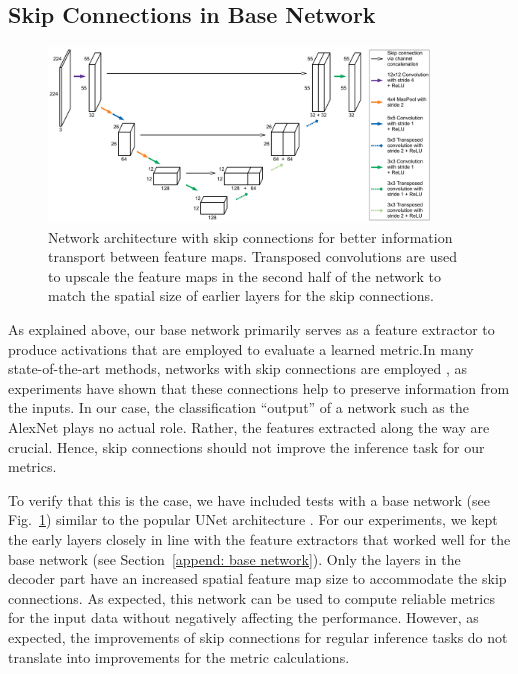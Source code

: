 \subsection{Skip Connections in Base Network}
\begin{figure}[tp]
    \centering
    \includegraphics[width=0.9\textwidth]{Images/NetworkUNet}
    \caption{Network architecture with skip connections for better information transport between feature maps. Transposed convolutions are used to upscale the feature maps in the second half of the network to match the spatial size of earlier layers for the skip connections.}
    \label{fig: skip network}
\end{figure}

As explained above, our base network primarily serves as a feature extractor to produce activations that are employed to evaluate a learned metric.In many state-of-the-art methods, networks with skip connections are employed \citep{ronneberger2015,he2016,huang2017}, as experiments have shown that these connections help to preserve information from the inputs. In our case, the classification ``output'' of a network such as the AlexNet plays no actual role. Rather, the features extracted along the way are crucial. Hence, skip connections should not improve the inference task for our metrics.

To verify that this is the case, we have included tests with a base network (see Fig.~\ref{fig: skip network}) similar to the popular UNet architecture \citep{ronneberger2015}. For our experiments, we kept the early layers closely in line with the feature extractors that worked well for the base network (see Section~\ref{append: base network}). Only the layers in the decoder part have an increased spatial feature map size to accommodate the skip connections. As expected, this network can be used to compute reliable metrics for the input data without negatively affecting the performance. However, as expected, the improvements of skip connections for regular inference tasks do not translate into improvements for the metric calculations.



